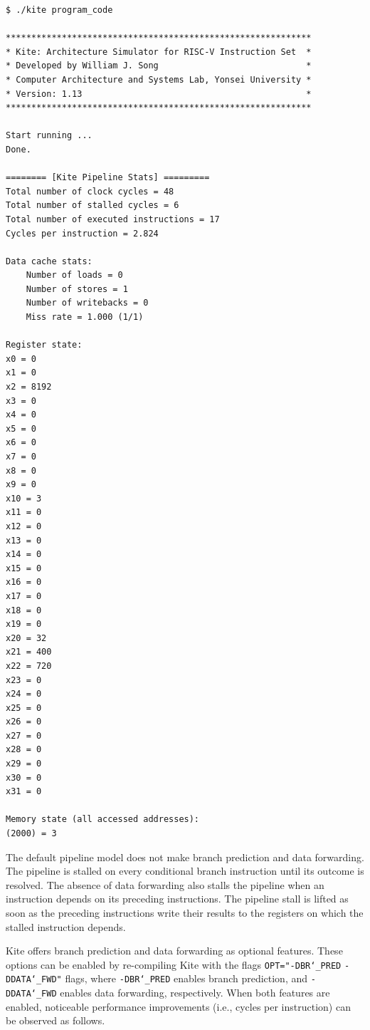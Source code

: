 \documentclass[10pt]{article}
\begin{document}
\begin{Verbatim}[frame=single,fontsize=\small]
$ ./kite program_code

************************************************************
* Kite: Architecture Simulator for RISC-V Instruction Set  *
* Developed by William J. Song                             *
* Computer Architecture and Systems Lab, Yonsei University *
* Version: 1.13                                            *
************************************************************

Start running ...
Done.

======== [Kite Pipeline Stats] =========
Total number of clock cycles = 48
Total number of stalled cycles = 6
Total number of executed instructions = 17
Cycles per instruction = 2.824

Data cache stats:
    Number of loads = 0
    Number of stores = 1
    Number of writebacks = 0
    Miss rate = 1.000 (1/1)

Register state:
x0 = 0
x1 = 0
x2 = 8192
x3 = 0
x4 = 0
x5 = 0
x6 = 0
x7 = 0
x8 = 0
x9 = 0
x10 = 3
x11 = 0
x12 = 0
x13 = 0
x14 = 0
x15 = 0
x16 = 0
x17 = 0
x18 = 0
x19 = 0
x20 = 32
x21 = 400
x22 = 720
x23 = 0
x24 = 0
x25 = 0
x26 = 0
x27 = 0
x28 = 0
x29 = 0
x30 = 0
x31 = 0

Memory state (all accessed addresses):
(2000) = 3
\end{Verbatim}

The default pipeline model does not make branch prediction and data forwarding.
The pipeline is stalled on every conditional branch instruction until its outcome is resolved.
The absence of data forwarding also stalls the pipeline when an instruction depends on its preceding instructions.
The pipeline stall is lifted as soon as the preceding instructions write their results to the registers on which the stalled instruction depends.

Kite offers branch prediction and data forwarding as optional features.
These options can be enabled by re-compiling Kite with the flags {\tt\small OPT="-DBR\char`_PRED} {\tt\small -DDATA\char`_FWD"} flags, where {\tt\small -DBR\char`_PRED} enables branch prediction, and {\tt\small -DDATA\char`_FWD} enables data forwarding, respectively.
When both features are enabled, noticeable performance improvements (i.e., cycles per instruction) can be observed as follows.
\end{document}
